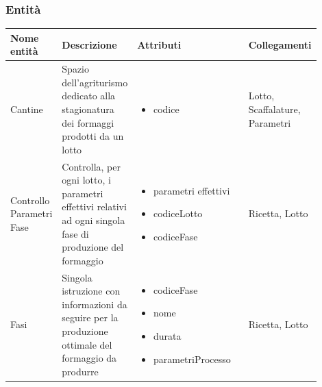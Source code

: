 \documentclass[12pt,a4paper]{article}
\begin{document}
\subsubsection{Entità}
\label{Produzione Entita}
\begin{center}
\setlength{\extrarowheight}{1.5pt}
\begin{longtable}{|p{0.14\linewidth}|p{0.20\linewidth}|p{0.36\linewidth}|p{0.20\linewidth}|}
\hline 
\textbf{Nome entità} 	& \textbf{Descrizione} & \textbf{Attributi} & \textbf{Collegamenti}\\ 


    
\hline
Cantine				 	&  Spazio dell'agriturismo dedicato alla stagionatura dei formaggi prodotti da un lotto 
					& \begin{itemize}
						\setlength{\itemindent}{-1em}
						\vspace{-15pt}
						\setlength\itemsep{-0.25em}
						\item codice
					\end{itemize}
					&  Lotto, Scaffalature, Parametri  \\ 

\hline
Controllo Parametri Fase				 	&  Controlla, per ogni lotto, i parametri effettivi relativi ad ogni singola fase di produzione del formaggio 
					& \begin{itemize}
						\setlength{\itemindent}{-1em}
						\vspace{-25pt}
						\setlength\itemsep{-0.25em}
						\item parametri effettivi
						\item codiceLotto
						\item codiceFase
					\end{itemize}
					&  Ricetta, Lotto  \\ 

\hline
Fasi				 	&  Singola istruzione con informazioni da seguire per la produzione ottimale del formaggio da produrre 
					& \begin{itemize}
						\setlength{\itemindent}{-1em}
						\vspace{-25pt}
						\setlength\itemsep{-0.25em}
						\item codiceFase
						\item nome
						\item durata
						\item parametriProcesso
					\end{itemize}
					&  Ricetta, Lotto  \\ 


\end{longtable}
\end{center}
\end{document}
